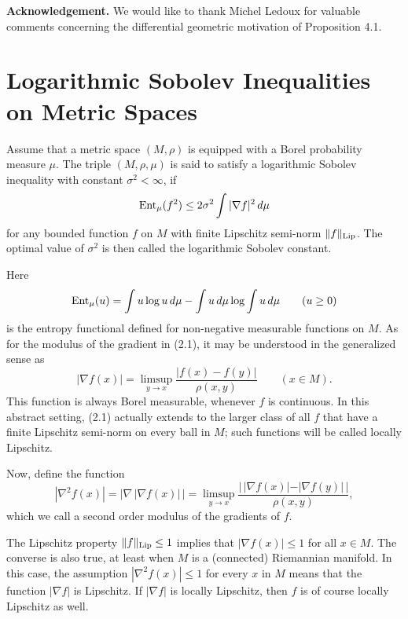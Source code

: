 \documentclass[reqno,12pt]{amsart}
\theoremstyle{plain}
\begin{document}
\vskip5mm
{\bf Acknowledgement.} We would like to thank Michel Ledoux for valuable 
comments concerning the differential geometric motivation of Proposition 4.1.

\vskip10mm
\section{{\bf Logarithmic Sobolev Inequalities on Metric Spaces}}
\setcounter{equation}{0}

\vskip2mm
\noindent
Assume that a metric space $(M,\rho)$ is equipped with a Borel probability 
measure $\mu$. The triple $(M,\rho,\mu)$ is said to satisfy a logarithmic 
Sobolev inequality with constant $\sigma^2 < \infty$, if 
\begin{equation}
{{\rm Ent}}_\mu(f^2) \leq 2\sigma^2 \int |\nabla f|^2\,d\mu
\end{equation}
for any bounded function $f$ on $M$ with finite Lipschitz 
semi-norm $\|f\|_{\rm Lip}$. The optimal value of $\sigma^2$ is then 
called the logarithmic Sobolev constant. 

Here
$$
{{\rm Ent}}_\mu(u) = \int u\log u\,d\mu - \int u\,d\mu \log \int u\,d\mu \qquad
(u \geq 0)
$$
is the entropy functional defined for non-negative measurable
functions on $M$. As for the modulus of the gradient in (2.1), it may be
understood in the generalized sense as
\begin{equation}
|\nabla f(x)| = \limsup_{y \rightarrow x} \frac{|f(x)-f(y)|}{\rho(x,y)}
\qquad (x \in M).
\end{equation}
This function is always Borel measurable, whenever $f$ is continuous.
In this abstract setting, (2.1) actually extends to the larger 
class of all $f$ that have a finite Lipschitz semi-norm on every 
ball in $M$; such functions will be called locally Lipschitz.

Now, define the function
\begin{equation}
|\nabla^2 f(x)| = |\nabla \, |\nabla f(x)|\,| = 
\limsup_{y \rightarrow x} \frac{|\,|\nabla f(x)|-|\nabla f(y)|\,|}{\rho(x,y)},
\end{equation}
which we call a second order modulus of the gradients of $f$.

The Lipschitz property $\|f\|_{\rm Lip} \leq 1$ implies that
$|\nabla f(x)| \leq 1$ for all $x \in M$. The converse is also true, at 
least when $M$ is a (connected) Riemannian manifold. In this case, the 
assumption $|\nabla^2 f(x)| \leq 1$ for every $x$ in $M$ 
means that the function $|\nabla f|$ is Lipschitz. If $|\nabla f|$ is 
locally Lipschitz, then $f$ is of course locally Lipschitz as well.
\end{document}
